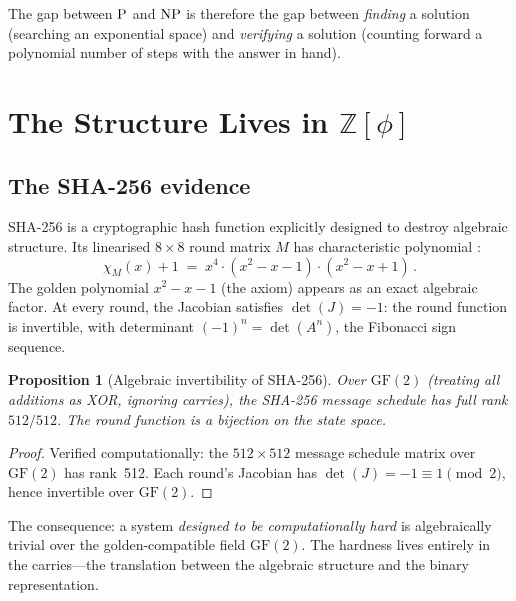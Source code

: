 \documentclass[12pt, a4paper]{article}
\theoremstyle{plain}
\newtheorem{proposition}[theorem]{Proposition}
\theoremstyle{definition}
\theoremstyle{remark}
\newcommand{\Z}{\mathbb{Z}}
\newcommand{\GF}{\mathrm{GF}}
\newcommand{\NP}{\textup{NP}}
\newcommand{\PP}{\textup{P}}
\DeclareMathOperator{\det}{det}
\begin{document}
The gap between $\PP$ and $\NP$ is therefore the gap between
\emph{finding} a solution (searching an exponential space) and
\emph{verifying} a solution (counting forward a polynomial number of
steps with the answer in hand).

\section{The Structure Lives in $\Z[\phi]$}
\label{sec:structure}

\subsection{The SHA-256 evidence}

SHA-256 is a cryptographic hash function explicitly designed to
destroy algebraic structure.  Its linearised $8 \times 8$ round matrix
$M$ has characteristic polynomial \cite{nos3bl33d-sha}:
\begin{equation}\label{eq:sha-char}
  \chi_M(x) + 1 \;=\; x^4 \cdot (x^2 - x - 1) \cdot (x^2 - x + 1)\,.
\end{equation}
The golden polynomial $x^2 - x - 1$ (the axiom) appears as an exact
algebraic factor.  At every round, the Jacobian satisfies
$\det(J) = -1$: the round function is invertible, with determinant
$(-1)^n = \det(A^n)$, the Fibonacci sign sequence.

\begin{proposition}[Algebraic invertibility of SHA-256]
\label{prop:sha-invertible}
Over $\GF(2)$ (treating all additions as XOR, ignoring carries), the
SHA-256 message schedule has full rank $512/512$.  The round function
is a bijection on the state space.
\end{proposition}

\begin{proof}
Verified computationally: the $512 \times 512$ message schedule matrix
over $\GF(2)$ has rank~512.  Each round's Jacobian has
$\det(J) = -1 \equiv 1 \pmod{2}$, hence invertible over $\GF(2)$.
\end{proof}

The consequence: a system \emph{designed to be computationally hard}
is algebraically trivial over the golden-compatible field $\GF(2)$.
The hardness lives entirely in the carries---the translation between
the algebraic structure and the binary representation.
\end{document}
